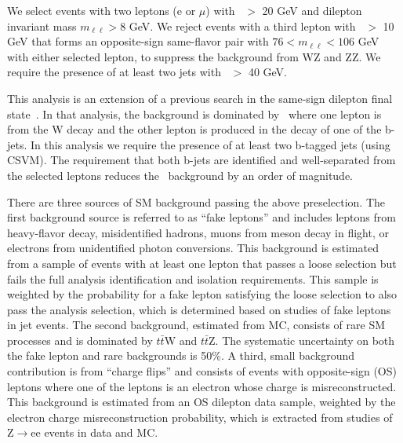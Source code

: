We select events with two leptons (e or $\mu$) with \pt\ $>$ 20 GeV and dilepton invariant mass $m_{\ell\ell}>8$ GeV. 
We reject events with a third lepton with \pt\ $>$ 10 GeV that forms an opposite-sign
same-flavor pair with $76 < m_{\ell\ell} < 106$ GeV with either selected lepton, to suppress
the background from WZ and ZZ. We require the presence of at least two jets with \pt\ $>$ 40 GeV.

This analysis is an extension of a previous search in the same-sign dilepton final state~\cite{ref:ss_inclusive}.
In that analysis, the background is dominated by \ttljets\ where one lepton is from the W decay and the other
lepton is produced in the decay of one of the b-jets. In this analysis we require the presence of at least two
b-tagged jets (using CSVM). The requirement that both b-jets are identified and well-separated from the selected leptons
reduces the \ttljets\ background by an order of magnitude. 


There are three sources of SM background passing the above preselection. 
The first background source is referred to as ``fake leptons'' and includes leptons from heavy-flavor decay, 
misidentified hadrons, muons from meson decay in flight, or electrons from unidentified photon conversions. 
This background is estimated from a sample of events with at least one lepton that passes a loose selection 
but fails the full analysis identification and isolation requirements. This sample is weighted by the probability 
for a fake lepton satisfying the loose selection to also pass the analysis selection, which is determined based 
on studies of fake 
leptons in jet events. The second background, estimated from MC, consists of rare SM processes and is dominated 
by $t\bar{t}$W and $t\bar{t}$Z. The systematic uncertainty on both the fake lepton and rare backgrounds is 50\%. 
A third, small background contribution is from ``charge flips'' and consists of events with opposite-sign (OS) leptons 
where one of the leptons is an electron whose charge is misreconstructed.
This background is estimated from an OS dilepton data sample, weighted by the electron charge misreconstruction probability, 
which is extracted from studies of Z$\to$ee events in data and MC.


